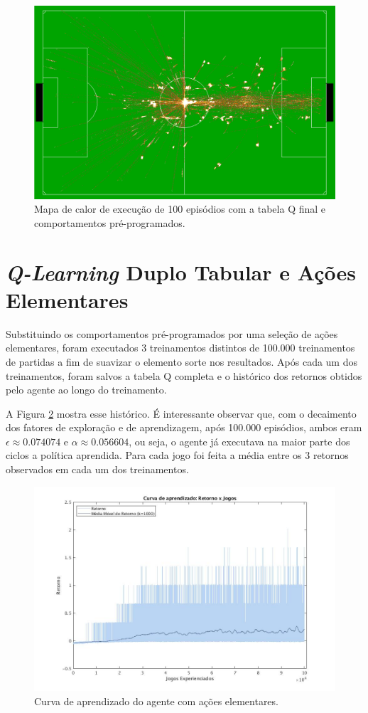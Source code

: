 \begin{figure}[H]
	\includegraphics[width=0.9\linewidth]{figs/behaviorsheat.png}
	\centering
	\caption{Mapa de calor de execução de 100 episódios com a tabela Q final e comportamentos pré-programados.}
	\label{fig:bhvheat}
\end{figure}


\section{\textit{Q-Learning} Duplo Tabular e Ações Elementares}

Substituindo os comportamentos pré-programados por uma seleção de ações elementares, foram executados 3 treinamentos distintos de 100.000 treinamentos de  partidas a fim de suavizar o elemento sorte nos resultados. Após cada um dos treinamentos, foram salvos a tabela Q completa e o histórico dos retornos obtidos pelo agente ao longo do treinamento.

A Figura \ref{fig:single-agent-curva} mostra esse histórico. É interessante observar que, com o decaimento dos fatores de exploração e de aprendizagem, após 100.000 episódios, ambos eram $\epsilon \approx 0.074074$ e $\alpha \approx 0.056604$, ou seja, o agente já executava na maior parte dos ciclos a política aprendida. Para cada jogo foi feita a média entre os 3 retornos observados em cada um dos treinamentos.

\begin{figure}[H]
	\includegraphics[width=0.93\linewidth]{figs/curva-qtabular.jpg}
	\centering
	\caption{Curva de aprendizado do agente com ações elementares. }
	\label{fig:single-agent-curva}
\end{figure}

